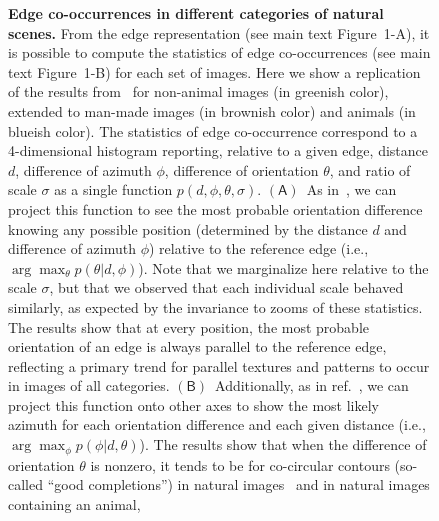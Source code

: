 \documentclass[a4paper]{article}
\begin{document}
\begin{figure}
{
} 
\caption{ 
{\bf Edge co-occurrences in different categories of natural scenes.} 
From the edge representation (see main text
Figure~1-A), it is possible to compute the statistics of edge
co-occurrences (see main text Figure~1-B) for each set of images.
Here we show a replication of the results from~\autocite{Geisler01}
for non-animal images (in greenish color), extended to man-made images
(in brownish color) and animals (in blueish color).
The statistics of edge co-occurrence correspond to a 4-dimensional histogram reporting, 
relative to a given edge, distance $d$, difference of azimuth $\phi$, difference of orientation $\theta$, and ratio of scale $\sigma$ as a single function $p(d, \phi, \theta, \sigma)$. 
$\mathsf{(A)}$~As in~\autocite{Geisler01}, we can project this function to see the most probable orientation difference 
knowing any possible position (determined by the distance $d$ and difference of azimuth $\phi$) 
relative to the reference edge (i.e., $\arg\max_\theta p( \theta | d, \phi)$). 
Note that we marginalize here relative to the scale $\sigma$, 
but that we observed that each individual scale behaved similarly, 
as expected by the invariance to zooms of these statistics. 
The results show that at every position, the most probable orientation of an edge 
is always parallel to the reference edge, 
reflecting a primary trend for parallel textures and patterns to occur in images of all categories.  
$\mathsf{(B)}$~Additionally, as in ref.~\autocite{Geisler01}, we can project this function 
onto other axes to show the most likely azimuth for 
each orientation difference and each given distance (i.e., $\arg\max_\phi p(\phi | d, \theta)$). 
The results show that when the difference of orientation $\theta$ is nonzero, 
it tends to be for co-circular contours (so-called ``good completions'') 
in natural images~\autocite{Sigman01} and in natural images containing an animal, 
}
\end{figure}
\end{document}
